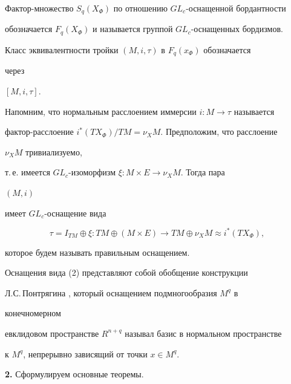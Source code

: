  


Фактор-множество $S_q(X_\Phi)$ по отношению $GL_c$-оснащенной бордантности 


обозначается $F_q(X_\Phi)$ и называется группой $GL_c$-оснащенных бордизмов. 


Класс эквивалентности тройки $(M,i,\tau)$ в $F_q(x_\Phi)$ обозначается 


через 


$[M,i,\tau]$. 


 


Напомним, что нормальным расслоением иммерсии $i:M\to\tau$ называется 


фактор-расслоение $i^*(TX_\Phi)/TM=\nu_X M$. Предположим, что расслоение 


$\nu_X M$ тривиализуемо, 


т.\,е. имеется $GL_c$-изоморфизм $\xi:M\times E\to\nu_X M$. Тогда пара 


$(M,i)$ 


имеет $GL_c$-оснащение вида 


\begin{equation} 


\tau=I_{TM}\oplus\xi:TM\oplus(M\times E)\to TM\oplus\nu_XM\approx 


i^*(TX_\Phi), 


\end{equation} 


которое будем называть правильным оснащением. 


 


Оснащения вида (2) представляют собой обобщение конструкции 


Л.С.\,Понтрягина \cite{Pon}, который оснащением подмногообразия $M^q$ в 


конечномерном 


евклидовом пространстве $R^{n+q}$ называл базис в нормальном пространстве 


к $M^q$, непрерывно зависящий от точки $x\in M^q$. 


 


{\bf 2.} Сформулируем основные теоремы. 


 


